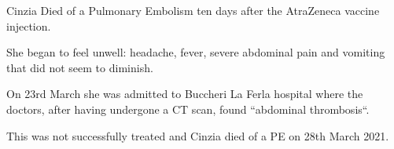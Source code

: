 Cinzia Died of a Pulmonary Embolism ten days after the AtraZeneca vaccine
injection.

She began to feel unwell: headache, fever, severe abdominal pain and vomiting
that did not seem to diminish.

On 23rd March she was admitted to Buccheri La Ferla hospital where the doctors,
after having undergone a CT scan, found “abdominal thrombosis“.

This was not successfully treated and Cinzia died of a PE on 28th March 2021.

